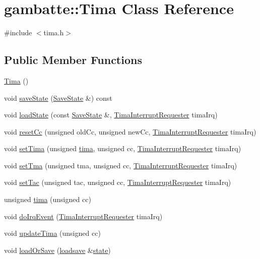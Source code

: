 \hypertarget{classgambatte_1_1Tima}{}\section{gambatte\+:\+:Tima Class Reference}
\label{classgambatte_1_1Tima}


{\ttfamily \#include $<$tima.\+h$>$}

\subsection*{Public Member Functions}
\begin{DoxyCompactItemize}
\item 
\hyperlink{classgambatte_1_1Tima_a335d610e3c5aeef9f80b7693d414d42e}{Tima} ()
\item 
void \hyperlink{classgambatte_1_1Tima_a40d563556152c52bbd838d70895e4be4}{save\+State} (\hyperlink{structgambatte_1_1SaveState}{Save\+State} \&) const
\item 
void \hyperlink{classgambatte_1_1Tima_a5754a2d76e158ed3cae830cb52cc58c3}{load\+State} (const \hyperlink{structgambatte_1_1SaveState}{Save\+State} \&, \hyperlink{classgambatte_1_1TimaInterruptRequester}{Tima\+Interrupt\+Requester} tima\+Irq)
\item 
void \hyperlink{classgambatte_1_1Tima_ae79b79227e0c0ace7d1dd173ae525b27}{reset\+Cc} (unsigned old\+Cc, unsigned new\+Cc, \hyperlink{classgambatte_1_1TimaInterruptRequester}{Tima\+Interrupt\+Requester} tima\+Irq)
\item 
void \hyperlink{classgambatte_1_1Tima_a6b9a6fd1515acfb8d0b1315da7883e51}{set\+Tima} (unsigned \hyperlink{classgambatte_1_1Tima_a73338015ebd3d2d5a00e7d2554c2f3c5}{tima}, unsigned cc, \hyperlink{classgambatte_1_1TimaInterruptRequester}{Tima\+Interrupt\+Requester} tima\+Irq)
\item 
void \hyperlink{classgambatte_1_1Tima_a937b897a30ad1289069716b309555dd4}{set\+Tma} (unsigned tma, unsigned cc, \hyperlink{classgambatte_1_1TimaInterruptRequester}{Tima\+Interrupt\+Requester} tima\+Irq)
\item 
void \hyperlink{classgambatte_1_1Tima_a1e9e5f8cd0e04e5f73eafbf364bef772}{set\+Tac} (unsigned tac, unsigned cc, \hyperlink{classgambatte_1_1TimaInterruptRequester}{Tima\+Interrupt\+Requester} tima\+Irq)
\item 
unsigned \hyperlink{classgambatte_1_1Tima_a73338015ebd3d2d5a00e7d2554c2f3c5}{tima} (unsigned cc)
\item 
void \hyperlink{classgambatte_1_1Tima_a9bf4e6fead69bda13cab7e7565d1c414}{do\+Irq\+Event} (\hyperlink{classgambatte_1_1TimaInterruptRequester}{Tima\+Interrupt\+Requester} tima\+Irq)
\item 
void \hyperlink{classgambatte_1_1Tima_af5bd0ed8cd9d288a87ee8530cd39bf39}{update\+Tima} (unsigned cc)
\item 
void \hyperlink{classgambatte_1_1Tima_a42f102eee85822ce7b484679d9d36132}{load\+Or\+Save} (\hyperlink{classgambatte_1_1loadsave}{loadsave} \&\hyperlink{ppu_8cpp_a2f2eca6997ee7baf8901725ae074d45b}{state})
\end{DoxyCompactItemize}
